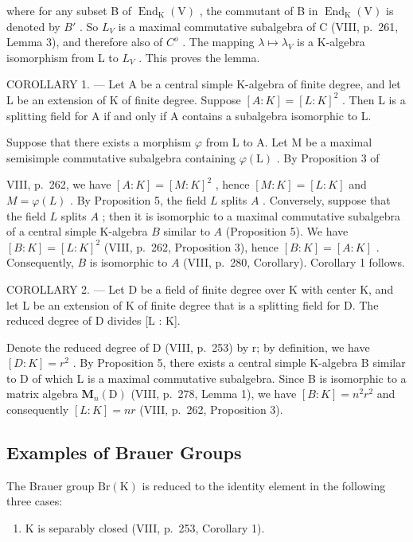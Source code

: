 where for any subset B of \(\operatorname{End}_{\mathrm{K}}(\mathrm{V})\) , the commutant of B in \(\operatorname{End}_{\mathrm{K}}(\mathrm{V})\) is denoted by \(B'\) . So \(L_{V}\) is a maximal commutative subalgebra of C (VIII, p.~261, Lemma 3), and therefore also of \(C^{o}\) . The mapping \(\lambda \mapsto \lambda_{V}\) is a K-algebra isomorphism from L to \(L_{V}\) . This proves the lemma.

COROLLARY 1. --- Let A be a central simple K-algebra of finite degree, and let L be an extension of K of finite degree. Suppose \([A:K]=[L:K]^{2}\) . Then L is a splitting field for A if and only if A contains a subalgebra isomorphic to L.

Suppose that there exists a morphism \(\varphi\) from L to A. Let M be a maximal semisimple commutative subalgebra containing \(\varphi(\mathrm{L})\) . By Proposition 3 of

VIII, p.~262, we have \([A:K] = [M:K]^2\) , hence \([M:K] = [L:K]\) and \(M = \varphi(L)\) . By Proposition 5, the field \(L\) splits \(A\) . Conversely, suppose that the field \(L\) splits \(A\) ; then it is isomorphic to a maximal commutative subalgebra of a central simple K-algebra \(B\) similar to \(A\) (Proposition 5). We have \([B:K] = [L:K]^2\) (VIII, p.~262, Proposition 3), hence \([B:K] = [A:K]\) . Consequently, \(B\) is isomorphic to \(A\) (VIII, p.~280, Corollary). Corollary 1 follows.

COROLLARY 2. --- Let D be a field of finite degree over K with center K, and let L be an extension of K of finite degree that is a splitting field for D. The reduced degree of D divides {[}L : K{]}.

Denote the reduced degree of D (VIII, p.~253) by r; by definition, we have \([D:K]=r^{2}\) . By Proposition 5, there exists a central simple K-algebra B similar to D of which L is a maximal commutative subalgebra. Since B is isomorphic to a matrix algebra \(\mathbf{M}_{n}(\mathrm{D})\) (VIII, p.~278, Lemma 1), we have \([B:K]=n^{2}r^{2}\) and consequently \([L:K]=nr\) (VIII, p.~262, Proposition 3).

\subsection{Examples of Brauer Groups}

The Brauer group \(\mathrm{Br}(\mathrm{K})\) is reduced to the identity element in the following three cases:

\begin{enumerate}
\def\labelenumi{\alph{enumi})}
\tightlist
\item
  K is separably closed (VIII, p.~253, Corollary 1).
\end{enumerate}

